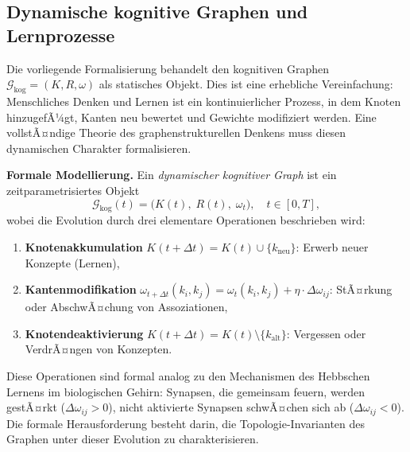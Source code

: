 ﻿\documentclass[12pt,a4paper]{article}
\theoremstyle{plain}
\theoremstyle{definition}
\theoremstyle{remark}
\newcommand{\GG}{\mathcal{G}}
\begin{document}
\subsection{Dynamische kognitive Graphen und Lernprozesse}
\label{subsec:dynamisch}

Die vorliegende Formalisierung behandelt den kognitiven Graphen $\GG_{\text{kog}} = (K, R, \omega)$ als statisches Objekt. Dies ist eine erhebliche Vereinfachung: Menschliches Denken und Lernen ist ein kontinuierlicher Prozess, in dem Knoten hinzugefÃ¼gt, Kanten neu bewertet und Gewichte modifiziert werden. Eine vollstÃ¤ndige Theorie des graphenstrukturellen Denkens muss diesen dynamischen Charakter formalisieren.

\textbf{Formale Modellierung.} Ein \emph{dynamischer kognitiver Graph} ist ein zeitparametrisiertes Objekt
\[
  \GG_{\text{kog}}(t) = \bigl(K(t),\; R(t),\; \omega_t\bigr), \quad t \in [0, T],
\]
wobei die Evolution durch drei elementare Operationen beschrieben wird:
\begin{enumerate}[label=(\alph*)]
  \item \textbf{Knotenakkumulation} $K(t+\Delta t) = K(t) \cup \{k_{\text{neu}}\}$: Erwerb neuer Konzepte (Lernen),
  \item \textbf{Kantenmodifikation} $\omega_{t+\Delta t}(k_i, k_j) = \omega_t(k_i, k_j) + \eta \cdot \Delta\omega_{ij}$: StÃ¤rkung oder AbschwÃ¤chung von Assoziationen,
  \item \textbf{Knotendeaktivierung} $K(t+\Delta t) = K(t) \setminus \{k_{\text{alt}}\}$: Vergessen oder VerdrÃ¤ngen von Konzepten.
\end{enumerate}

Diese Operationen sind formal analog zu den Mechanismen des Hebbschen Lernens im biologischen Gehirn: Synapsen, die gemeinsam feuern, werden gestÃ¤rkt ($\Delta\omega_{ij} > 0$), nicht aktivierte Synapsen schwÃ¤chen sich ab ($\Delta\omega_{ij} < 0$). Die formale Herausforderung besteht darin, die Topologie-Invarianten des Graphen unter dieser Evolution zu charakterisieren.
\end{document}
